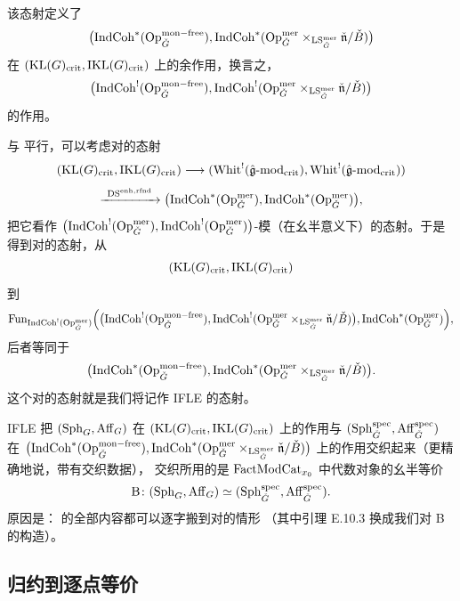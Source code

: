 该态射定义了
\[
\bigl(\mathrm{IndCoh}^{*}(\mathrm{Op}^{\mathrm{mon-free}}_{\check G}),
\mathrm{IndCoh}^{*}(\mathrm{Op}^{\mathrm{mer}}_{\check G}
\times_{\mathrm{LS}^{\mathrm{mer}}_{\check G}}\check{\mathfrak{n}}/\check B)\bigr)
\]
在 $(\mathrm{KL}(G)_{\mathrm{crit}},\mathrm{IKL}(G)_{\mathrm{crit}})$ 上的余作用，换言之，
\[
\bigl(\mathrm{IndCoh}^{!}(\mathrm{Op}^{\mathrm{mon-free}}_{\check G}),
\mathrm{IndCoh}^{!}(\mathrm{Op}^{\mathrm{mer}}_{\check G}
\times_{\mathrm{LS}^{\mathrm{mer}}_{\check G}}\check{\mathfrak{n}}/\check B)\bigr)
\]
的作用。

与 \cite[第 6.1 节]{ABC+24a} 平行，可以考虑对的态射
\begin{equation}
(\mathrm{KL}(G)_{\mathrm{crit}},\mathrm{IKL}(G)_{\mathrm{crit}})\longrightarrow
(\mathrm{Whit}^{!}(\hat{\mathfrak{g}}\text{-}\mathrm{mod}_{\mathrm{crit}}),
\mathrm{Whit}^{!}(\hat{\mathfrak{g}}\text{-}\mathrm{mod}_{\mathrm{crit}}))
\label{eq:3.4.1}
\end{equation}
\begin{equation}
\xrightarrow{\ \mathrm{DS}^{\mathrm{enh,rfnd}}\ }
\bigl(\IndCoh^{*}(\Op^{\mer}_{\check G}),
\IndCoh^{*}(\Op^{\mer}_{\check G})\bigr),
\label{eq:3.4.2}
\end{equation}
把它看作
$\bigl(\mathrm{IndCoh}^{!}(\mathrm{Op}^{\mathrm{mer}}_{\check G}),
\mathrm{IndCoh}^{!}(\mathrm{Op}^{\mathrm{mer}}_{\check G})\bigr)$-模（在幺半意义下）的态射。于是得到对的态射，从
\[
(\mathrm{KL}(G)_{\mathrm{crit}},\mathrm{IKL}(G)_{\mathrm{crit}})
\]
到
\[
\operatorname{Fun}_{\mathrm{IndCoh}^{!}(\mathrm{Op}^{\mathrm{mer}}_{\check G})}
\Bigl(\bigl(\mathrm{IndCoh}^{!}(\mathrm{Op}^{\mathrm{mon-free}}_{\check G}),
\mathrm{IndCoh}^{!}(\mathrm{Op}^{\mathrm{mer}}_{\check G}
\times_{\mathrm{LS}^{\mathrm{mer}}_{\check G}}\check{\mathfrak{n}}/\check B)\bigr),
\mathrm{IndCoh}^{*}(\mathrm{Op}^{\mathrm{mer}}_{\check G})\Bigr),
\]
后者等同于
\[
\bigl(\mathrm{IndCoh}^{*}(\mathrm{Op}^{\mathrm{mon-free}}_{\check G}),
\mathrm{IndCoh}^{*}(\mathrm{Op}^{\mathrm{mer}}_{\check G}
\times_{\mathrm{LS}^{\mathrm{mer}}_{\check G}}\check{\mathfrak{n}}/\check B)\bigr).
\]
这个对的态射就是我们将记作 IFLE 的态射。

\begin{remark}\label{rem:3.4.1.1}
IFLE 把 $(\mathrm{Sph}_G,\mathrm{Aff}_G)$ 在 $(\mathrm{KL}(G)_{\mathrm{crit}},\mathrm{IKL}(G)_{\mathrm{crit}})$ 上的作用与
$(\mathrm{Sph}^{\mathrm{spec}}_{\check G},\mathrm{Aff}^{\mathrm{spec}}_{\check G})$ 在
$\bigl(\mathrm{IndCoh}^{*}(\mathrm{Op}^{\mathrm{mon-free}}_{\check G}),
\mathrm{IndCoh}^{*}(\mathrm{Op}^{\mathrm{mer}}_{\check G}\times_{\mathrm{LS}^{\mathrm{mer}}_{\check G}}
\check{\mathfrak{n}}/\check B)\bigr)$ 上的作用交织起来（更精确地说，带有交织数据），
交织所用的是 $\mathrm{FactModCat}_{x_0}$ 中代数对象的幺半等价
\[
\mathrm{B}\colon
(\mathrm{Sph}_G,\mathrm{Aff}_G)\simeq (\mathrm{Sph}^{\mathrm{spec}}_{\check G},\mathrm{Aff}^{\mathrm{spec}}_{\check G}).
\]
原因是：\cite[附录 E.10.4 至 E.11 末]{ABC+24a} 的全部内容都可以逐字搬到对的情形
（其中引理 E.10.3 换成我们对 B 的构造）。
\end{remark}

\subsection{归约到逐点等价}
\label{sec:ifle-reduction}

